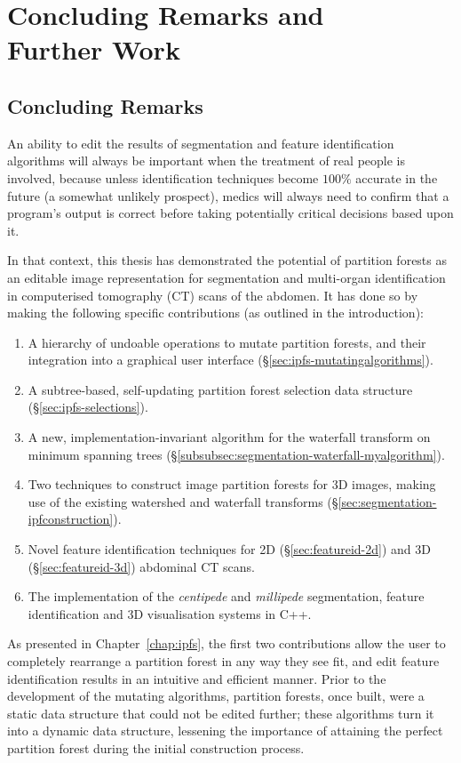\chapter[Concluding Remarks and Further Work]{Concluding Remarks and\\Further Work}
\label{chap:conclusions}

\section{Concluding Remarks}

An ability to edit the results of segmentation and feature identification algorithms will always be important when the treatment of real people is involved, because unless identification techniques become $100\%$ accurate in the future (a somewhat unlikely prospect), medics will always need to confirm that a program's output is correct before taking potentially critical decisions based upon it.

In that context, this thesis has demonstrated the potential of partition forests as an editable image representation for segmentation and multi-organ identification in computerised tomography (CT) scans of the abdomen. It has done so by making the following specific contributions (as outlined in the introduction):
%
\begin{enumerate}
\item A hierarchy of undoable operations to mutate partition forests, and their integration into a graphical user interface (\S\ref{sec:ipfs-mutatingalgorithms}).
\item A subtree-based, self-updating partition forest selection data structure (\S\ref{sec:ipfs-selections}).
\item A new, implementation-invariant algorithm for the waterfall transform on minimum spanning trees (\S\ref{subsubsec:segmentation-waterfall-myalgorithm}).
\item Two techniques to construct image partition forests for 3D images, making use of the existing watershed and waterfall transforms (\S\ref{sec:segmentation-ipfconstruction}).
\item Novel feature identification techniques for 2D (\S\ref{sec:featureid-2d}) and 3D (\S\ref{sec:featureid-3d}) abdominal CT scans.
\item The implementation of the \emph{centipede} and \emph{millipede} segmentation, feature identification and 3D visualisation systems in C++.
\end{enumerate}
%
As presented in Chapter~\ref{chap:ipfs}, the first two contributions allow the user to completely rearrange a partition forest in any way they see fit, and edit feature identification results in an intuitive and efficient manner. Prior to the development of the mutating algorithms, partition forests, once built, were a static data structure that could not be edited further; these algorithms turn it into a dynamic data structure, lessening the importance of attaining the perfect partition forest during the initial construction process.

